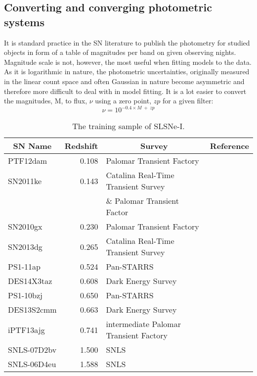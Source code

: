 \subsection{Converting and converging photometric systems}
It is standard practice in the SN literature to publish the photometry for studied objects in form of a table of magnitudes per band on given observing nights. Magnitude scale is not, however, the most useful when fitting models to the data. As it is logarithmic in nature, the photometric uncertainties, originally measured in the linear count space and often Gaussian in nature become asymmetric and therefore more difficult to deal with in model fitting. It is a lot easier to convert the magnitudes, M, to flux, $\nu$ using a zero point, $zp$ for a given filter:
\begin{equation}
\label{eq:MagToFlux}
\nu = 10^{-0.4 \times M~+~zp}
\end{equation}

\begin{table}
\begin{center}
  \caption{The training sample of SLSNe-I.}
\label{tab:PubishedSLSNe}
\begin{tabular}{|l|r|l|l|}
\hline
  \multicolumn{1}{|c|}{SN Name} &
  \multicolumn{1}{c|}{Redshift} &
  \multicolumn{1}{c|}{Survey} &
  \multicolumn{1}{c|}{Reference} \\
\hline
  PTF12dam & 0.108 & Palomar Transient Factory & \citep{2013Natur.502..346N}\\
  SN2011ke & 0.143 & Catalina Real-Time Transient Survey & \citet{2013ApJ...770..128I}\\
  &&\& Palomar Transient Factor & \\
  SN2010gx & 0.230 & Palomar Transient Factory & \cite{2010ApJ...724L..16P}\\
  SN2013dg & 0.265 & Catalina Real-Time Transient Survey & \cite{2014MNRAS.444.2096N} \\
  PS1-11ap & 0.524 & Pan-STARRS & \cite{2014MNRAS.437..656M}\\
  DES14X3taz & 0.608 & Dark Energy Survey & \cite{2016ApJ...818L...8S} \\
  PS1-10bzj & 0.650 & Pan-STARRS & \cite{2013ApJ...771...97L}\\
  DES13S2cmm & 0.663 & Dark Energy Survey & \cite{2015MNRAS.449.1215P} \\
  iPTF13ajg & 0.741 & intermediate Palomar Transient Factory &\cite{2014ApJ...797...24V}\\
  SNLS-07D2bv & 1.500 & SNLS &\cite{2013ApJ...779...98H}\\
  SNLS-06D4eu & 1.588 & SNLS &\cite{2013ApJ...779...98H}\\
\hline\end{tabular}
\end{center}
\end{table}